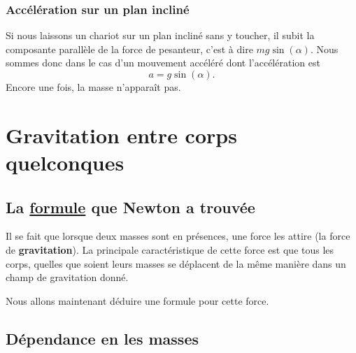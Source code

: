\documentclass[a4paper,12pt]{book}
\theoremstyle{mes_exemples}	\newtheorem{exemple}[numtho]{Exemple}
\theoremstyle{mes_tho}
\newcommand{\defe}[2]{\textbf{#1}\index{#2}}
\begin{document}
\subsubsection{Accélération sur un plan incliné}

Si nous laissons un chariot sur un plan incliné sans y toucher, il subit la composante parallèle de la force de pesanteur, c'est à dire $mg\sin(\alpha)$. Nous sommes donc dans le cas d'un mouvement accéléré dont l'accélération est
\begin{equation}
	a=g\sin(\alpha).
\end{equation}
Encore une fois, la masse n'apparaît pas.

\section{Gravitation entre corps quelconques}

\subsection{La \href{http://fr.wikipedia.org/wiki/Loi_universelle_de_la_gravitation}{formule} que Newton a trouvée}

Il se fait que lorsque deux masses sont en présences, une force les attire (la force de \defe{gravitation}{gravitation}). La principale caractéristique de cette force est que tous les corps, quelles que soient leurs masses se déplacent de la même manière dans un champ de gravitation donné.

Nous allons maintenant déduire une formule pour cette force.

\subsection{Dépendance en les masses}
\end{document}
